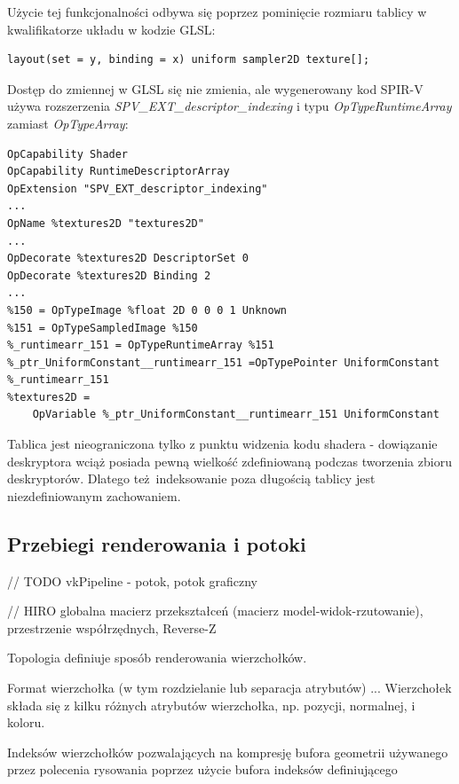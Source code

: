 Użycie tej funkcjonalności odbywa się poprzez pominięcie rozmiaru tablicy w kwalifikatorze układu w kodzie GLSL:
\lstset{language=GLSL}
\begin{lstlisting}[caption={Kwalifikator układu dla nieograniczonej tablicy tekstur},captionpos=b]
layout(set = y, binding = x) uniform sampler2D texture[];
\end{lstlisting}
Dostęp do zmiennej w GLSL się nie zmienia, ale wygenerowany kod SPIR-V używa rozszerzenia \textit{SPV\_EXT\_descriptor\_indexing} i typu \textit{OpTypeRuntimeArray} zamiast \textit{OpTypeArray}:
\lstset{language=SPIRV}
\begin{lstlisting}[caption={Kod SPIR-V wygenerowany dla nieograniczonej tablicy deskryptorów},captionpos=b]
OpCapability Shader
OpCapability RuntimeDescriptorArray
OpExtension "SPV_EXT_descriptor_indexing"
...
OpName %textures2D "textures2D"
...
OpDecorate %textures2D DescriptorSet 0
OpDecorate %textures2D Binding 2
...
%150 = OpTypeImage %float 2D 0 0 0 1 Unknown
%151 = OpTypeSampledImage %150
%_runtimearr_151 = OpTypeRuntimeArray %151
%_ptr_UniformConstant__runtimearr_151 =OpTypePointer UniformConstant %_runtimearr_151
%textures2D =
	OpVariable %_ptr_UniformConstant__runtimearr_151 UniformConstant
\end{lstlisting}

Tablica jest nieograniczona tylko z punktu widzenia kodu shadera - dowiązanie deskryptora wciąż posiada pewną wielkość zdefiniowaną podczas tworzenia zbioru deskryptorów. Dlatego też indeksowanie poza długością tablicy jest niezdefiniowanym zachowaniem.

\subsection{Przebiegi renderowania i potoki}

// TODO vkPipeline - potok, potok graficzny

// HIRO globalna macierz przekształceń (macierz model-widok-rzutowanie), przestrzenie współrzędnych, Reverse-Z

Topologia definiuje sposób renderowania wierzchołków.

Format wierzchołka (w tym rozdzielanie lub separacja atrybutów) ...
Wierzchołek składa się z kilku różnych atrybutów wierzchołka, np. pozycji, normalnej, i koloru.

Indeksów wierzchołków pozwalających na kompresję bufora geometrii używanego przez polecenia rysowania poprzez użycie bufora indeksów definiującego 


